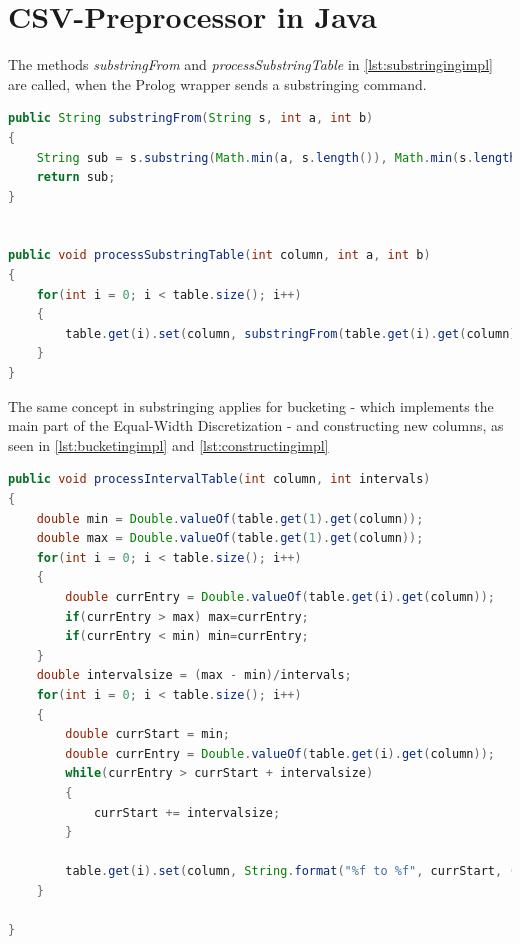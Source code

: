 \documentclass[bachelor,english]{info1thesis}
\begin{document}
\section{CSV-Preprocessor in Java}

The methods \textit{substringFrom} and \textit{processSubstringTable} in \ref{lst:substringingimpl} are called, when the Prolog wrapper sends a substringing command.

	\begin{lstlisting}[language=java, caption= Implementation substringing in Preprocessor.java, label={lst:substringingimpl}]
public String substringFrom(String s, int a, int b)
{
	String sub = s.substring(Math.min(a, s.length()), Math.min(s.length(), b));
	return sub;
}


public void processSubstringTable(int column, int a, int b)
{
	for(int i = 0; i < table.size(); i++)
	{
		table.get(i).set(column, substringFrom(table.get(i).get(column), a, b));
	}
}
	\end{lstlisting}
	
	
The same concept in substringing applies for bucketing - which implements the main part of the Equal-Width Discretization - and constructing new columns, as seen in \ref{lst:bucketingimpl} and \ref{lst:constructingimpl}

	\begin{lstlisting}[language=java, caption= Implementation substringing in Preprocessor.java, label={lst:bucketingimpl}]
public void processIntervalTable(int column, int intervals)
{
	double min = Double.valueOf(table.get(1).get(column));
	double max = Double.valueOf(table.get(1).get(column));
	for(int i = 0; i < table.size(); i++)
	{
		double currEntry = Double.valueOf(table.get(i).get(column));
		if(currEntry > max) max=currEntry;
		if(currEntry < min) min=currEntry;
	}
	double intervalsize = (max - min)/intervals;
	for(int i = 0; i < table.size(); i++)
	{
		double currStart = min;
		double currEntry = Double.valueOf(table.get(i).get(column));
		while(currEntry > currStart + intervalsize)
		{
			currStart += intervalsize;
		}

		table.get(i).set(column, String.format("%f to %f", currStart, (currStart+intervalsize)));
	}

}
\end{lstlisting}
\end{document}
